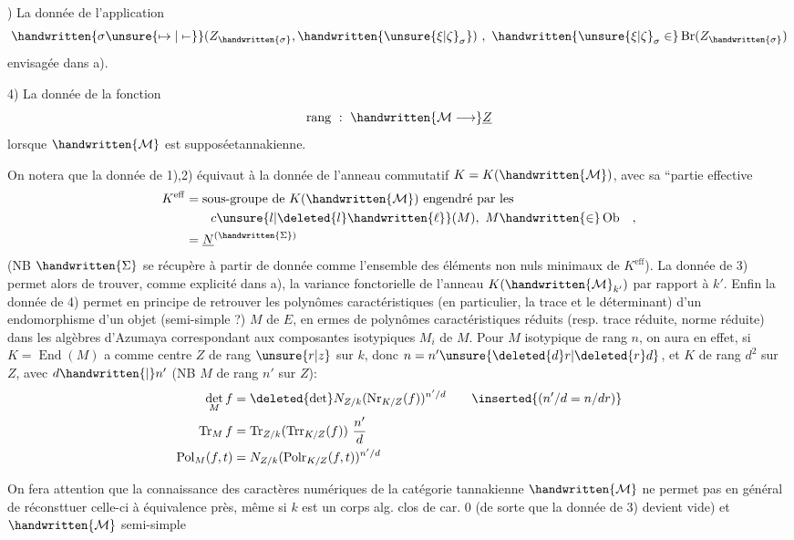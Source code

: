 ) La donnée de l'application
\[
\handwritten{\sigma\unsure{\mapsto|\mathrel{\mapstochar\relbar}}}(Z_{\handwritten{\sigma}},\handwritten{\unsure{\xi|\zeta}_\sigma})\ ,\ \handwritten{\unsure{\xi|\zeta}_\sigma\in}\operatorname{Br}(Z_{\handwritten{\sigma}})
\]
envisagée dans a).

4) La donnée de la fonction
\[
\operatorname{rang}\ :\ \handwritten{\mathcal{M}\longrightarrow}\underline{Z}
\]
lorsque $\handwritten{\mathcal{M}}$ est supposéetannakienne.

On notera que la donnée de 1),2) équivaut à la donnée de l'anneau commutatif $K=K(\handwritten{\mathcal{M}})$, avec sa ``partie effective
\[
\begin{aligned}
K^{\mathrm{eff}}&=\text{sous-groupe de }K(\handwritten{\mathcal{M}})\text{ engendré par les}\\
&\qquad c\unsure{l|\deleted{l}\handwritten{\ell}}(M),\ M\handwritten{\in}\operatorname{Ob}\quad,\\
&=\underline{N}^{(\handwritten{\Sigma})}
\end{aligned}
\]
(NB $\handwritten{\Sigma}$ se récupère à partir de  donnée comme l'ensemble des éléments non nuls minimaux de $K^{\mathrm{eff}}$). La donnée de 3) permet alors de trouver, comme explicité dans a), la variance fonctorielle de l'anneau $K(\handwritten{\mathcal{M}}_{k'})$ par rapport à $k'$. Enfin la donnée de 4) permet en principe de retrouver les polynômes caractéristiques (en particulier, la trace et le déterminant) d'un endomorphisme d'un objet (semi-simple ?) $M$ de $E$, en ermes de polynômes caractéristiques réduits (resp. trace réduite, norme réduite) dans les algèbres d'Azumaya correspondant aux composantes isotypiques $M_i$ de $M$. Pour $M$ isotypique de rang $n$, on aura en effet, si $K=\operatorname{End}(M)$ a comme centre $Z$ de rang $\unsure{r|z}$ sur $k$, donc $n=n'\unsure{\deleted{d}r|\deleted{r}d}$, et $K$ de rang $d^2$ sur $Z$, avec $d\handwritten{\mid}n'$ (NB $M$ de rang $n'$ sur $Z$):
\[
\begin{aligned}
\det_M f&=\deleted{\det}N_{Z/k}(\operatorname{Nr}_{K/Z}(f))^{n'/d}\qquad\inserted{(n'/d=n/dr)}\\
\operatorname{Tr}_M f&=\operatorname{Tr}_{Z/k}(\operatorname{Trr}_{K/Z}(f))\ \frac{n'}{d}\\
\operatorname{Pol}_M(f,t)&=N_{Z/k}(\operatorname{Polr}_{K/Z}(f,t))^{n'/d}
\end{aligned}
\]

On fera attention que la connaissance des caractères numériques de la catégorie tannakienne $\handwritten{\mathcal{M}}$ ne permet pas en général de réconsttuer celle-ci à équivalence près, même si $k$ est un corps alg. clos de car. 0 (de sorte que la donnée de 3) devient vide) et $\handwritten{\mathcal{M}}$ semi-simple
